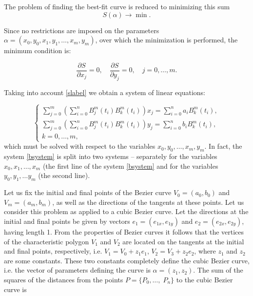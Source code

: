 \documentclass[12pt]{article}
\begin{document}
 The problem of finding the best-fit curve is reduced to minimizing this sum
 \begin{equation}
   S(\alpha )\to \min. 
 \end{equation}
 
 Since no restrictions are imposed on the parameters $\alpha =(x_{0} ,y_{0} ,x_{1} ,y_{1} ,\ldots ,x_{m} ,y_{m} )$,
 over which the minimization is performed, the minimum condition is:
 
 \begin{equation}
 \frac{\partial S}{\partial x_{j} } =0,\quad \frac{\partial S}{\partial y_{j} } =0,\quad j=0,\ldots ,m.
 \end{equation}
 
 Taking into account \eqref{slabel} we obtain a system of linear equations:
 
 \begin{equation}
 \label{bsystem}
 \left\{\begin{array}{l} 
   {\sum _{j=0}^{m}(\sum _{i=0}^{n}B_{j}^{m}  (t_{i}) B_{k}^{m} (t_{i} )) x_{j} =\sum_{i=0}^{n}a_{i}  B_{k}^{m} (t_{i} ), } \\
  {\sum _{j=0}^{m}\left(\sum _{i=0}^{n}B_{j}^{m}  \left(t_{i} \right) B_{k}^{m} \left(t_{i} \right)\right) y_{j} =\sum_{i=0}^{n}b_{i}  B_{k}^{m} \left(t_{i} \right), } \\
   {k=0,\ldots ,m,} 
   \end{array}\right.
 \end{equation}
 which must be solved with respect to the variables $x_{0} ,y_{0} ,\ldots ,x_{m} ,y_{m} $.
 In fact, the system \eqref{bsystem} is split into two systems -- separately for the variables $x_{0} ,x_{1} ,\ldots ,x_{m} $
 (the first line of the system \eqref{bsystem} and for the variables $y_{0} ,y_{1} ,\ldots y_{m} $ (the second line).
 
 Let us fix the initial and final points of the Bezier curve $V_{0} =(a_{0} ,b_{0} )$ and $V_{m} =(a_{m} ,b_{m} )$,
 as well as the directions of the tangents at these points. Let us consider this problem as applied to a cubic Bezier curve.
 Let the directions at the initial and final points be given by vectors $e_{1} =(e_{1x} ,e_{1y} )$ and $e_{2} =(e_{2x} ,e_{2y} )$,
 having length 1. From the properties of Bezier curves it follows that the vertices of the characteristic polygon $V_{1} $ and $V_{2} $
 are located on the tangents at the initial and final points, respectively, i.e.
 $V_{1} =V_{0} +z_{1} e_{1} $, $V_{2} =V_{3} +z_{2} e_{2} $, where $z_{1} $ and $z_{2} $ are some constants.
 These two constants completely define the cubic Bezier curve, i.e. the vector of parameters defining the curve is $\alpha =(z_{1} ,z_{2} )$.
 The sum of the squares of the distances from the points $P=\{ P_{0} ,\ldots ,\; P_{n} \} $ to the cubic Bezier curve is
 
\end{document}
